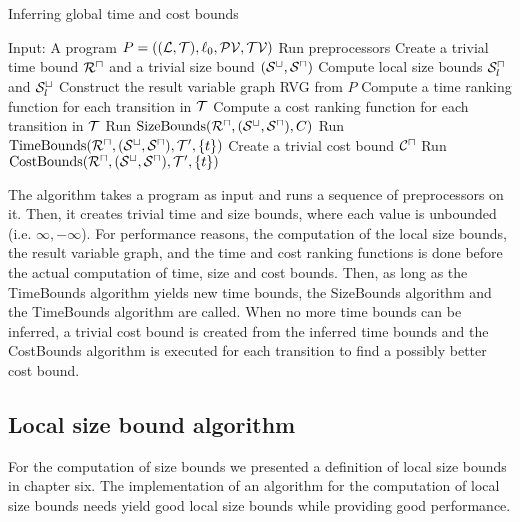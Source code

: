 \begin{algorithm}
\caption{Inferring global time and cost bounds}\label{complete_algorithm}
\begin{algorithmic}[1]
  \State Input: A program $P = ((\mathcal{L}, \mathcal{T}),\ell_0,\mathcal{PV},\mathcal{TV})$
  \State Run preprocessors
  \State Create a trivial time bound ${\mathcal{R}^\sqcap}$ and a trivial size bound ${({\mathcal{S}^\sqcup}, {\mathcal{S}^\sqcap})}$
  \State Compute local size bounds ${\mathcal{S}^\sqcap_l}$ and ${\mathcal{S}^\sqcup_l}$
  \State Construct the result variable graph RVG from $P$
  \State Compute a time ranking function for each transition in $\mathcal{T}$
  \State Compute a cost ranking function for each transition in $\mathcal{T}$
  \Repeat
      \State Run $\text{SizeBounds}({\mathcal{R}^\sqcap}, {({\mathcal{S}^\sqcup}, {\mathcal{S}^\sqcap})}, C)$
    \EndFor
        \State Run $\text{TimeBounds}({\mathcal{R}^\sqcap}, {({\mathcal{S}^\sqcup}, {\mathcal{S}^\sqcap})}, \mathcal{T}', \lbrace t \rbrace)$
      \EndFor
    \EndFor
  \State Create a trivial cost bound ${\mathcal{C}^\sqcap}$
    \State Run $\text{CostBounds}({\mathcal{R}^\sqcap}, {({\mathcal{S}^\sqcup}, {\mathcal{S}^\sqcap})}, \mathcal{T}', \lbrace t \rbrace)$
  \EndFor
\end{algorithmic}
\end{algorithm}


The algorithm takes a program as input and runs a sequence of preprocessors on it.
Then, it creates trivial time and size bounds, where each value is unbounded (i.e. $\infty, -\infty$).
For performance reasons, the computation of the local size bounds, the result variable graph, and the time and cost ranking functions is done before the actual computation of time, size and cost bounds.
Then, as long as the TimeBounds algorithm yields new time bounds, the SizeBounds algorithm and the TimeBounds algorithm are called.
When no more time bounds can be inferred, a trivial cost bound is created from the inferred time bounds and the CostBounds algorithm is executed for each transition to find a possibly better cost bound.

\subsection{Local size bound algorithm}

For the computation of size bounds we presented a definition of local size bounds in chapter six.
The implementation of an algorithm for the computation of local size bounds needs yield good local size bounds while providing good performance.

